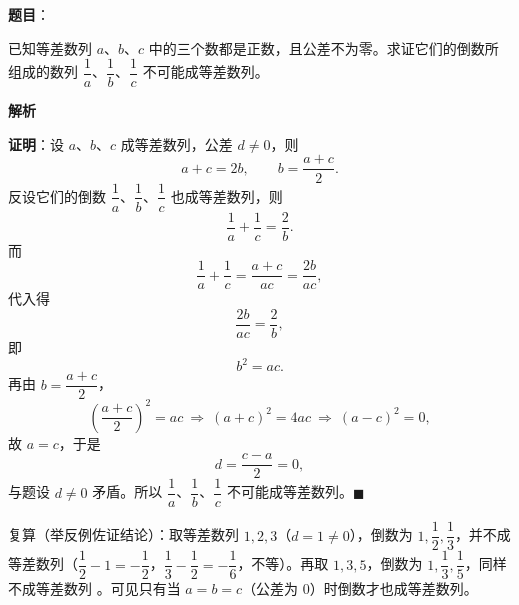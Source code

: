 \begin{answer}

\textbf{题目}：

已知等差数列 $a$、$b$、$c$ 中的三个数都是正数，且公差不为零。求证它们的倒数所组成的数列 $\dfrac1a$、$\dfrac1b$、$\dfrac1c$ 不可能成等差数列。

\textbf{解析}

\textbf{证明}：设 $a$、$b$、$c$ 成等差数列，公差 $d\ne0$，则
\nopagebreak[4]
\[
a+c=2b,\qquad b=\frac{a+c}{2}.
\]
反设它们的倒数 $\dfrac1a$、$\dfrac1b$、$\dfrac1c$ 也成等差数列，则
\nopagebreak[4]
\[
\frac1a+\frac1c=\frac2b.
\]
而
\nopagebreak[4]
\[
\frac1a+\frac1c=\frac{a+c}{ac}=\frac{2b}{ac},
\]
代入得
\nopagebreak[4]
\[
\frac{2b}{ac}=\frac2b,
\]
即
\nopagebreak[4]
\[
b^2=ac.
\]
再由 $b=\dfrac{a+c}{2}$，
\nopagebreak[4]
\[
\left(\frac{a+c}{2}\right)^2=ac\ \Longrightarrow\ (a+c)^2=4ac\ \Longrightarrow\ (a-c)^2=0,
\]
故 $a=c$，于是
\nopagebreak[4]
\[
d=\frac{c-a}{2}=0,
\]
与题设 $d\ne0$ 矛盾。所以 $\dfrac1a$、$\dfrac1b$、$\dfrac1c$ 不可能成等差数列。$\blacksquare$

复算（举反例佐证结论）：取等差数列 $1,2,3$（$d=1\ne0$），倒数为 $1,\dfrac12,\dfrac13$，并不成等差数列（$\dfrac12-1=-\dfrac12$，$\dfrac13-\dfrac12=-\dfrac16$，不等）。再取 $1,3,5$，倒数为 $1,\dfrac13,\dfrac15$，同样不成等差数列 。可见只有当 $a=b=c$（公差为 $0$）时倒数才也成等差数列。


\end{answer}
